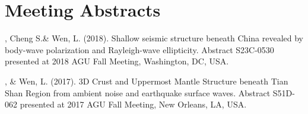 \section*{Meeting Abstracts}
\begin{etaremune}
\item
    \Xiao, Cheng S.\& Wen, L. (2018).
    Shallow seismic structure beneath China revealed by body-wave polarization and Rayleigh-wave ellipticity. 
    Abstract S23C-0530 presented at 2018 AGU Fall Meeting, Washington, DC, USA.
\item
    \Xiao, \& Wen, L. (2017).
    3D Crust and Uppermost Mantle Structure beneath Tian Shan Region from ambient noise and earthquake surface waves. 
    Abstract S51D-062 presented at 2017 AGU Fall Meeting, New Orleans, LA, USA.
\end{etaremune}
